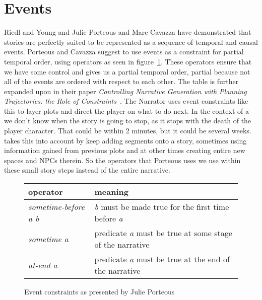 \section{Events}
Riedl and Young\cite{Riedl:2004:IPM:1018409.1018753} and Julie Porteous and Marc Cavazza\cite{Porteous:2009:CNG:1695522.1695557} have demonstrated that stories are perfectly suited to be represented as a sequence of temporal and causal events.
Porteous and Cavazza suggest to use events as a constraint for partial temporal order, using operators as seen in figure~\ref{fig:events}.
These operators ensure that we have some control and gives us a partial temporal order, partial because not all of the events are ordered with respect to each other.
The table is further expanded upon in their paper \textit{Controlling Narrative Generation with Planning Trajectories: the Role of Constraints}~\cite{Porteous:2009:CNG:1695522.1695557}. The Narrator uses event constraints like this to layer plots and direct the player on what to do next.
In the context of a \rogue we don't know when the story is going to stop, as it stops with the death of the player character.
That could be within 2 minutes, but it could be several weeks.
\diage takes this into account by keep adding segments onto a story, sometimes using information gained from previous plots and at other times creating entire new spaces and NPCs therein.
So the operators that Porteous uses we use within these small story steps instead of the entire narrative.

\begin{figure}
\begin{tabular}{|l||l|}
\hline 
operator & meaning \\ 
\hline
\hline 
\textit{sometime-before a b} & \textit{b} must be made true for the first time before \textit{a} \\ 
\hline 
\textit{sometime a} & predicate \textit{a} must be true at some stage of the narrative \\ 
\hline 
\textit{at-end a} & predicate \textit{a} must be true at the end of the narrative \\ 
\hline 
\end{tabular} 
\caption{Event constraints as presented by Julie Porteous}\label{fig:events}
\end{figure}

